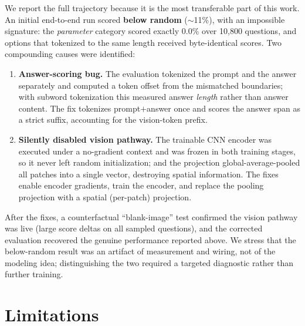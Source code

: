 \documentclass[11pt]{article}
\begin{document}
We report the full trajectory because it is the most transferable part of this
work. An initial end-to-end run scored \textbf{below random} ($\sim$11\%), with
an impossible signature: the \emph{parameter} category scored exactly 0.0\% over
10{,}800 questions, and options that tokenized to the same length received
byte-identical scores. Two compounding causes were identified:

\begin{enumerate}[leftmargin=*]
    \item \textbf{Answer-scoring bug.} The evaluation tokenized the prompt and
    the answer separately and computed a token offset from the mismatched
    boundaries; with subword tokenization this measured answer \emph{length}
    rather than answer content. The fix tokenizes prompt$+$answer once and scores
    the answer span as a strict suffix, accounting for the vision-token prefix.
    \item \textbf{Silently disabled vision pathway.} The trainable CNN encoder
    was executed under a no-gradient context and was frozen in both training
    stages, so it never left random initialization; and the projection
    global-average-pooled all patches into a single vector, destroying spatial
    information. The fixes enable encoder gradients, train the encoder, and
    replace the pooling projection with a spatial (per-patch) projection.
\end{enumerate}

After the fixes, a counterfactual ``blank-image'' test confirmed the vision
pathway was live (large score deltas on all sampled questions), and the corrected
evaluation recovered the genuine performance reported above. We stress that the
below-random result was an artifact of measurement and wiring, not of the
modeling idea; distinguishing the two required a targeted diagnostic rather than
further training.

\section{Limitations}
\label{sec:limitations}
\end{document}
